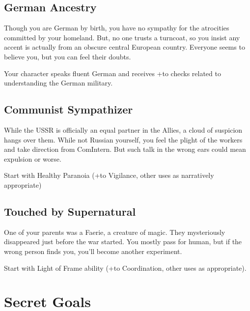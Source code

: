 \documentclass{book}
\newcommand{\bbb}{\BoostDie }
\begin{document}
\begin{multicols}{2}
\subsection{German Ancestry}

Though you are German by birth, you have no sympathy for the atrocities committed by your homeland.  But, no one trusts a turncoat, so you insist any accent is actually from an obscure central European country.  Everyone seems to believe you, but you can feel their doubts.

Your character speaks fluent German and receives +\bbb to checks related to understanding the German military.

\subsection{Communist Sympathizer}

While the USSR is officially an equal partner in the Allies, a cloud of suspicion hangs over them.  While not Russian yourself, you feel the plight of the workers and take direction from ComIntern.  But such talk in the wrong ears could mean expulsion or worse.

Start with Healthy Paranoia (+\bbb to Vigilance, other uses as narratively appropriate)

%
%

\subsection{Touched by Supernatural}

One of your parents was a Faerie, a creature of magic.  They mysteriously disappeared just before the war started.  You mostly pass for human, but if the wrong person finds you, you'll become another experiment.

Start with Light of Frame ability (+\bbb to Coordination, other uses as appropriate).

\section{Secret Goals}


\end{multicols}
\end{document}
